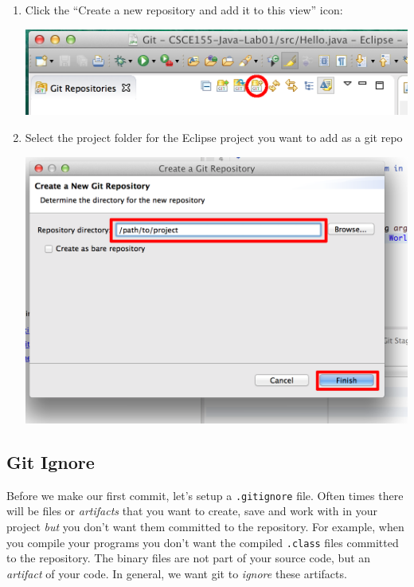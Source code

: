 \documentclass[12pt]{scrartcl}
\begin{document}
\begin{enumerate}
\begin{center}
	\end{center}
  \item Click the ``Create a new repository and add it to this view'' icon:
  	\begin{center}
	\includegraphics[scale=0.75]{./hack1.0-files/eclipseGitRepoCreateNewMarkUp}
	\end{center}
  \item Select the project folder for the Eclipse project you want to add as a git repo
    	\begin{center}
	\includegraphics[scale=0.45]{./hack1.0-files/eclipseCreateRepoDialogAMarkUp}
	\end{center}
\end{enumerate}	

\subsection{Git Ignore}

Before we make our first commit, let's setup a \texttt{.gitignore} 
file.  Often times there will be files or \emph{artifacts} that you want 
to create, save and work with in your project \emph{but} you 
don't want them committed to the repository.  For example, when
you compile your programs you don't want the compiled \texttt{.class}
files committed to the repository.  The binary files are not part of 
your source code, but an \emph{artifact} of your code.  In general, 
we want git to \emph{ignore} these artifacts.
\end{document}
